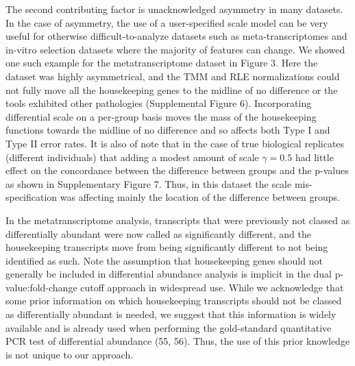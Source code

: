 \documentclass[
]{article}
\begin{document}
The second contributing factor is unacknowledged asymmetry in many
datasets. In the case of asymmetry, the use of a user-specified scale
model can be very useful for otherwise difficult-to-analyze datasets
such as meta-transcriptomes and in-vitro selection datasets where the
majority of features can change. We showed one such example for the
metatranscriptome dataset in Figure 3. Here the dataset was highly
asymmetrical, and the TMM and RLE normalizations could not fully move
all the housekeeping genes to the midline of no difference or the tools
exhibited other pathologies (Supplemental Figure 6). Incorporating
differential scale on a per-group basis moves the mass of the
housekeeping functions towards the midline of no difference and so
affects both Type I and Type II error rates. It is also of note that in
the case of true biological replicates (different individuals) that
adding a modest amount of scale \(\gamma=0.5\) had little effect on the
concordance between the difference between groups and the p-values as
shown in Supplementary Figure 7. Thus, in this dataset the scale
mis-specification was affecting mainly the location of the difference
between groups.

In the metatranscriptome analysis, transcripts that were previously not
classed as differentially abundant were now called as significantly
different, and the housekeeping transcripts move from being
significantly different to not being identified as such. Note the
assumption that housekeeping genes should not generally be included in
differential abundance analysis is implicit in the dual
p-value:fold-change cutoff approach in widespread use. While we
acknowledge that some prior information on which housekeeping
transcripts should not be classed as differentially abundant is needed,
we suggest that this information is widely available and is already used
when performing the gold-standard quantitative PCR test of differential
abundance (55, 56). Thus, the use of this prior knowledge is not unique
to our approach.
\end{document}

